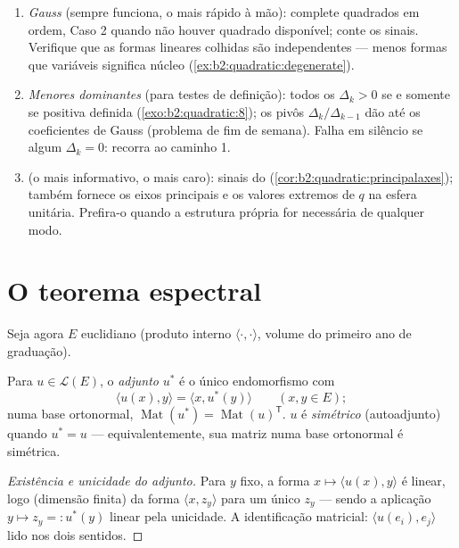 \begin{method}\label{met:b2:quadratic:signature}
\begin{enumerate}
  \item \emph{Gauss} (sempre funciona, o mais rápido à mão): complete
        quadrados em ordem, Caso 2 quando não houver quadrado disponível;
        conte os sinais. Verifique que as formas lineares colhidas
        são independentes --- menos formas que variáveis significa
        núcleo (\cref{ex:b2:quadratic:degenerate}).
  \item \emph{Menores dominantes} (para testes de definição): todos os
        $\Delta_k > 0$ se e somente se positiva definida
        (\cref{exo:b2:quadratic:8}); os pivôs
        $\Delta_k/\Delta_{k-1}$ dão até os coeficientes
        de Gauss (problema de fim de semana). Falha em silêncio se algum
        $\Delta_k = 0$: recorra ao caminho 1.
  \item \emph{} (o mais informativo, o mais caro):
        sinais do 
        (\cref{cor:b2:quadratic:principalaxes}); também fornece
        os eixos principais e os valores extremos de $q$ na
        esfera unitária. Prefira-o quando a estrutura própria for
        necessária de qualquer modo.
\end{enumerate}
\end{method}

\section{O teorema espectral}

Seja agora $E$ euclidiano (produto interno $\langle\cdot,\cdot\rangle$,
volume do primeiro ano de graduação).

\begin{definition}\label{def:b2:quadratic:adjoint}
Para $u \in \mathcal{L}(E)$, o \emph{adjunto}
$u^*$ é o único endomorfismo com
\[
\langle u(x), y\rangle = \langle x, u^*(y)\rangle
\qquad (x, y \in E);
\]
numa base ortonormal, $\operatorname{Mat}(u^*) =
\operatorname{Mat}(u)^{\mathsf T}$. $u$ é
\emph{simétrico} (autoadjunto) quando
$u^* = u$ --- equivalentemente, sua matriz numa base ortonormal é
simétrica.
\end{definition}

\begin{proof}[Existência e unicidade do adjunto]
Para $y$ fixo, a forma $x \mapsto \langle u(x), y\rangle$ é
linear, logo (dimensão finita) da forma $\langle x,
z_y\rangle$ para um único $z_y$ --- sendo a aplicação $y \mapsto z_y =:
u^*(y)$ linear pela unicidade. A identificação matricial:
$\langle u(e_i), e_j\rangle$ lido nos dois sentidos.
\end{proof}

